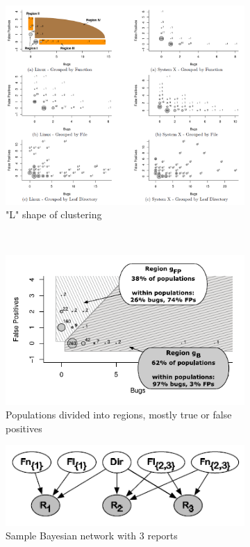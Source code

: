  \begin{figure}[H]
     \begin{subfigure}{1\textwidth}
         \centering
         \includegraphics[scale=0.4]{./src/feedback_rank_l_shape.png}
         \caption{"L" shape of clustering}\label{fr:lshape}
     \end{subfigure}\\
     \begin{subfigure}{.5\textwidth}
         \centering
         \includegraphics[scale=0.6]{./src/feedback_rank_partition.png}
         \caption{Populations divided into regions, mostly true or false positives}\label{fr:partition}
     \end{subfigure}%
     \begin{subfigure}{.7\textwidth}
         \centering
         \includegraphics[scale=0.4]{./src/feedback_rank_bayes.png}
         \caption{Sample Bayesian network with 3 reports}\label{fr:bayes}
     \end{subfigure}
     \caption{}
 \end{figure}


